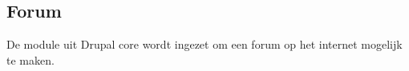 \subsection{Forum}\label{forum}

De  module uit Drupal core wordt ingezet om een forum op het internet mogelijk te maken.

